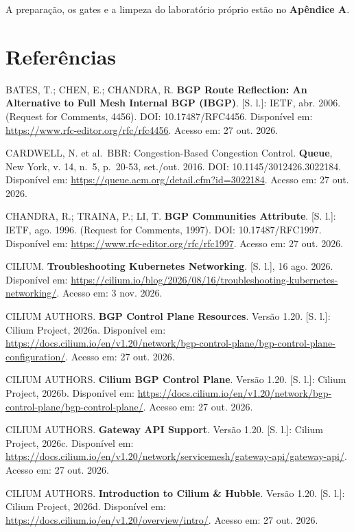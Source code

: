 \documentclass[12pt,openany,oneside,a4paper,chapter=TITLE,english,brazil]{abntex2}
\newenvironment{referenciasabnt}
  {\begin{flushleft}\SingleSpacing\setlength{\parindent}{0pt}\setlength{\parskip}{\baselineskip}}
  {\end{flushleft}}
\begin{document}
A preparação, os gates e a limpeza do laboratório próprio estão no \textbf{Apêndice A}.

\postextual
\chapter*{Referências}
\begin{referenciasabnt}

BATES, T.; CHEN, E.; CHANDRA, R. \textbf{BGP Route Reflection: An Alternative to Full Mesh Internal BGP (IBGP)}. {[}S. l.{]}: IETF, abr. 2006. (Request for Comments, 4456). DOI: 10.17487/RFC4456. Disponível em: \url{https://www.rfc-editor.org/rfc/rfc4456}. Acesso em: 27 out. 2026.

CARDWELL, N. et al.~BBR: Congestion-Based Congestion Control. \textbf{Queue}, New York, v. 14, n.~5, p.~20-53, set./out. 2016. DOI: 10.1145/3012426.3022184. Disponível em: \url{https://queue.acm.org/detail.cfm?id=3022184}. Acesso em: 27 out. 2026.

CHANDRA, R.; TRAINA, P.; LI, T. \textbf{BGP Communities Attribute}. {[}S. l.{]}: IETF, ago. 1996. (Request for Comments, 1997). DOI: 10.17487/RFC1997. Disponível em: \url{https://www.rfc-editor.org/rfc/rfc1997}. Acesso em: 27 out. 2026.

CILIUM. \textbf{Troubleshooting Kubernetes Networking}. {[}S. l.{]}, 16 ago. 2026. Disponível em: \url{https://cilium.io/blog/2026/08/16/troubleshooting-kubernetes-networking/}. Acesso em: 3 nov. 2026.

CILIUM AUTHORS. \textbf{BGP Control Plane Resources}. Versão 1.20. {[}S. l.{]}: Cilium Project, 2026a. Disponível em: \url{https://docs.cilium.io/en/v1.20/network/bgp-control-plane/bgp-control-plane-configuration/}. Acesso em: 27 out. 2026.

CILIUM AUTHORS. \textbf{Cilium BGP Control Plane}. Versão 1.20. {[}S. l.{]}: Cilium Project, 2026b. Disponível em: \url{https://docs.cilium.io/en/v1.20/network/bgp-control-plane/bgp-control-plane/}. Acesso em: 27 out. 2026.

CILIUM AUTHORS. \textbf{Gateway API Support}. Versão 1.20. {[}S. l.{]}: Cilium Project, 2026c. Disponível em: \url{https://docs.cilium.io/en/v1.20/network/servicemesh/gateway-api/gateway-api/}. Acesso em: 27 out. 2026.

CILIUM AUTHORS. \textbf{Introduction to Cilium \& Hubble}. Versão 1.20. {[}S. l.{]}: Cilium Project, 2026d. Disponível em: \url{https://docs.cilium.io/en/v1.20/overview/intro/}. Acesso em: 27 out. 2026.


\end{referenciasabnt}
\end{document}
